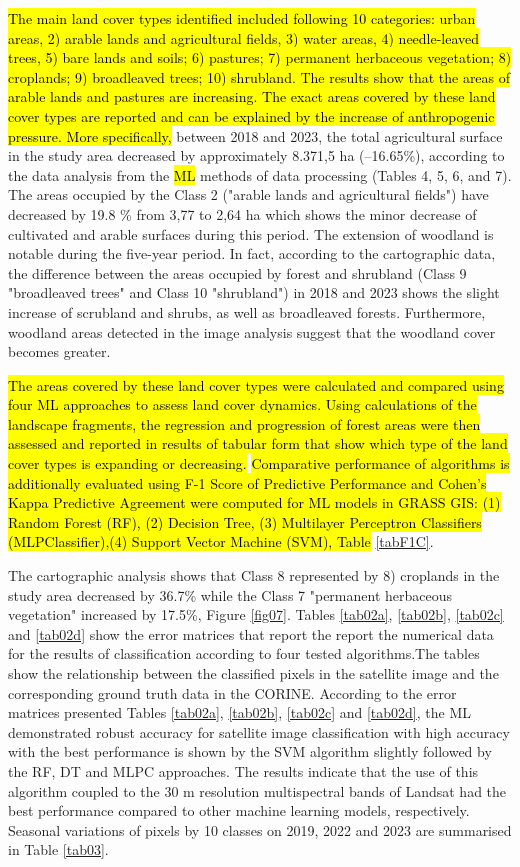 \documentclass[jimaging,article,submit,pdftex,moreauthors]{Definitions/mdpi}
\begin{document}
\hl{The main land cover types identified included following 10 categories: urban areas, 2) arable lands and agricultural fields, 3) water areas, 4) needle-leaved trees, 5) bare lands and soils; 6) pastures; 7) permanent herbaceous vegetation; 8) croplands; 9) broadleaved trees; 10) shrubland. The results show that the areas of arable lands and pastures are increasing. The exact areas covered by these land cover types are reported and can be explained by the increase of anthropogenic pressure. More specifically, }between 2018 and 2023, the total agricultural surface in the study area decreased by approximately 8.371,5 ha (--16.65\%), according to the data analysis from the \hl{ML} methods of data processing (Tables 4, 5, 6, and 7). The areas occupied by the Class 2 ("arable lands and agricultural fields") have decreased by 19.8 \% from 3,77 to 2,64  ha which shows the minor decrease of cultivated and arable surfaces during this period. The extension of woodland is notable during the five-year period. In fact, according to the cartographic data, the difference between the areas occupied by forest and shrubland (Class  9 "broadleaved trees" and Class 10 "shrubland") in 2018 and 2023 shows the slight increase of scrubland and shrubs, as well as broadleaved forests. Furthermore, woodland areas detected in the image analysis suggest that the woodland cover becomes greater. 

\hl{The areas covered by these land cover types were calculated and compared using four ML approaches to assess land cover dynamics. Using calculations of the landscape fragments, the regression and progression of forest areas were then assessed and reported in results of tabular form that show which type of the land cover types is expanding or decreasing. } \hl{Comparative performance of algorithms is additionally evaluated using F-1 Score of Predictive Performance and Cohen's Kappa Predictive Agreement were computed for ML models in GRASS GIS: (1) Random Forest (RF), (2) Decision Tree, (3) Multilayer Perceptron Classifiers (MLPClassifier),(4) Support Vector Machine (SVM), Table }\ref{tabF1C}. 

The cartographic analysis shows that Class 8 represented by 8) croplands in the study area decreased by 36.7\% while the Class 7 "permanent herbaceous vegetation" increased by 17.5\%, Figure \ref{fig07}. Tables \ref{tab02a}, \ref{tab02b}, \ref{tab02c} and \ref{tab02d} show the error matrices that report the report the numerical data{ }for the results of classification according to four tested algorithms{.}The tables show the relationship between the classified pixels in the satellite image and the corresponding ground truth data in the CORINE{.} {According to the error matrices presented Tables} \ref{tab02a}, \ref{tab02b}, \ref{tab02c} and \ref{tab02d}, the ML demonstrated robust accuracy for satellite image classification with high accuracy with the best performance is shown by the SVM algorithm slightly followed by the RF, DT and MLPC approaches. The results indicate that the use of this algorithm coupled to the 30 m resolution multispectral bands of Landsat had the best performance compared to other machine learning models, respectively. Seasonal variations of pixels by 10 classes on 2019, 2022 and 2023 are summarised in Table \ref{tab03}. 
\end{document}
